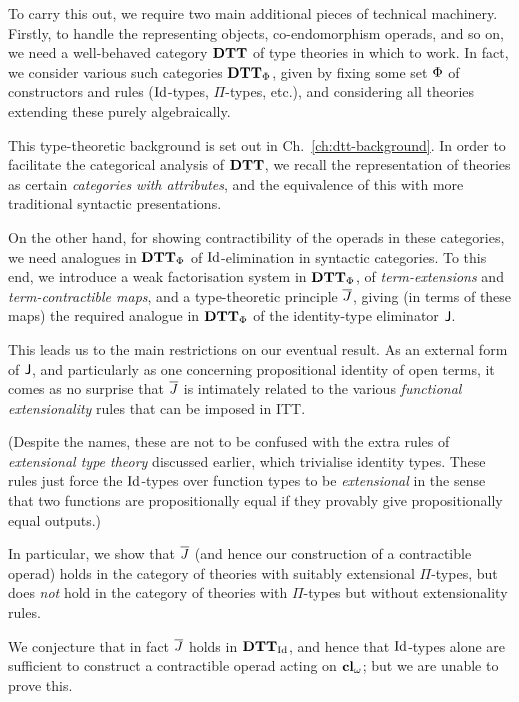\begin{para}
To carry this out, we require two main additional pieces of technical machinery.  Firstly, to handle the representing objects, co-endomorphism operads, and so on, we need a well-behaved category $\mathbf{DTT}$ of type theories in which to work.  In fact, we consider various such categories $\mathbf{DTT}_{\Phi}$, given by fixing some set ${\Phi}$ of constructors and rules ($\mathrm{Id}$-types, $\Pi$-types, etc.), and considering all theories extending these purely algebraically.

This type-theoretic background is set out in Ch.~\ref{ch:dtt-background}.  In order to facilitate the categorical analysis of $\mathbf{DTT}$, we recall the representation of theories as certain \emph{categories with attributes}, and the equivalence of this with more traditional syntactic presentations.

On the other hand, for showing contractibility of the operads in these categories, we need analogues in $\mathbf{DTT}_{\Phi}$ of $\mathrm{Id}$-elimination in syntactic categories.  To this end, we introduce a weak factorisation system in $\mathbf{DTT}_{\Phi}$, of \emph{term-extensions} and \emph{term-contractible maps}, and a type-theoretic principle $\overline{J}$, giving (in terms of these maps) the required analogue in $\mathbf{DTT}_{\Phi}$ of the identity-type eliminator $\mathsf{J}$.
\end{para}

\begin{para}
This leads us to the main restrictions on our eventual result.  As an external form of $\mathsf{J}$, and particularly as one concerning propositional identity of open terms, it comes as no surprise that $\overline{J}$ is intimately related to the various \emph{functional extensionality} rules that can be imposed in ITT.

(Despite the names, these are not to be confused with the extra rules of \emph{extensional type theory} discussed earlier, which trivialise identity types.  These rules just force the $\mathrm{Id}$-types over function types to be \emph{extensional} in the sense that two functions are propositionally equal if they provably give propositionally equal outputs.)

In particular, we show that $\overline{J}$ (and hence our construction of a contractible operad) holds in the category of theories with suitably extensional $\Pi$-types, but does \emph{not} hold in the category of theories with $\Pi$-types but without extensionality rules.  

We conjecture that in fact $\overline{J}$ holds in $\mathbf{DTT}_{\mathrm{Id}}$, and hence that $\mathrm{Id}$-types alone are sufficient to construct a contractible operad acting on $\mathbf{cl}_\omega$; but we are unable to prove this.
\end{para}

